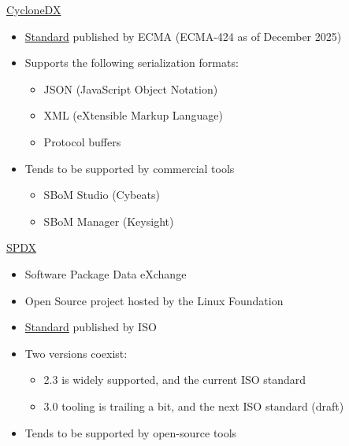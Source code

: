 \begin{frame}{\href{https://cyclonedx.org/}{CycloneDX}}
  \begin{itemize}
    \item \href{https://ecma-international.org/publications-and-standards/standards/ecma-424/}{Standard}
          published by ECMA (ECMA-424 as of December 2025)
    \item Supports the following serialization formats:
    \begin{itemize}
      \item JSON (JavaScript Object Notation)
      \item XML (eXtensible Markup Language)
      \item Protocol buffers
    \end{itemize}
    \item Tends to be supported by commercial tools
    \begin{itemize}
      \item SBoM Studio (Cybeats)
      \item SBoM Manager (Keysight)
    \end{itemize}
  \end{itemize}
\end{frame}

\begin{frame}{\href{https://spdx.dev/}{SPDX}}
  \begin{itemize}
    \item Software Package Data eXchange
    \item Open Source project hosted by the Linux Foundation
    \item \href{https://www.iso.org/standard/81870.html}{Standard} published by ISO
    \item Two versions coexist:
    \begin{itemize}
      \item 2.3 is widely supported, and the current ISO standard
      \item 3.0 tooling is trailing a bit, and the next ISO standard (draft)
    \end{itemize}
    \item Tends to be supported by open-source tools
  \end{itemize}
\end{frame}

